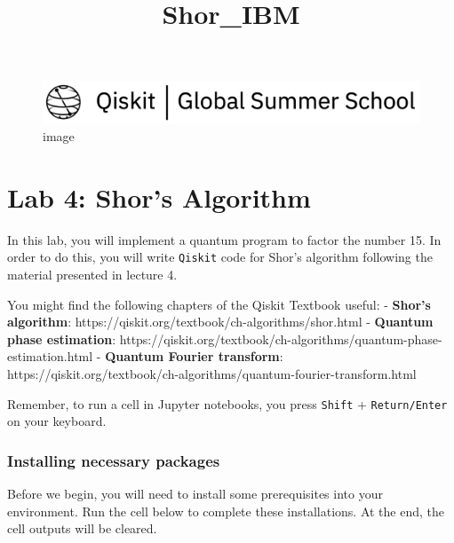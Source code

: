 \documentclass[11pt]{article}
\title{Shor\_IBM}
\makeatletter
\newcommand{\boxspacing}{\kern\kvtcb@left@rule\kern\kvtcb@boxsep}
\newcommand{\prompt}[4]{
        \ttfamily\llap{{\color{#2}[#3]:\hspace{3pt}#4}}\vspace{-\baselineskip}
    }
\makeatother
\begin{document}
    
    \maketitle
    
    

    
    \begin{figure}
\centering
\includegraphics{resources/qgss-header.png}
\caption{image}
\end{figure}

    \hypertarget{lab-4-shors-algorithm}{%
\section{Lab 4: Shor's Algorithm}\label{lab-4-shors-algorithm}}

    In this lab, you will implement a quantum program to factor the number
15. In order to do this, you will write \texttt{Qiskit} code for Shor's
algorithm following the material presented in lecture 4.

You might find the following chapters of the Qiskit Textbook useful: -
\textbf{Shor's algorithm}:
https://qiskit.org/textbook/ch-algorithms/shor.html - \textbf{Quantum
phase estimation}:
https://qiskit.org/textbook/ch-algorithms/quantum-phase-estimation.html
- \textbf{Quantum Fourier transform}:
https://qiskit.org/textbook/ch-algorithms/quantum-fourier-transform.html

Remember, to run a cell in Jupyter notebooks, you press \texttt{Shift} +
\texttt{Return/Enter} on your keyboard.

    \hypertarget{installing-necessary-packages}{%
\subsubsection{Installing necessary
packages}\label{installing-necessary-packages}}

    Before we begin, you will need to install some prerequisites into your
environment. Run the cell below to complete these installations. At the
end, the cell outputs will be cleared.

    \begin{tcolorbox}[breakable, size=fbox, boxrule=1pt, pad at break*=1mm,colback=cellbackground, colframe=cellborder]
\prompt{In}{incolor}{ }{\boxspacing}
\begin{Verbatim}[commandchars=\\\{\}]

\end{Verbatim}
\end{tcolorbox}
\end{document}
